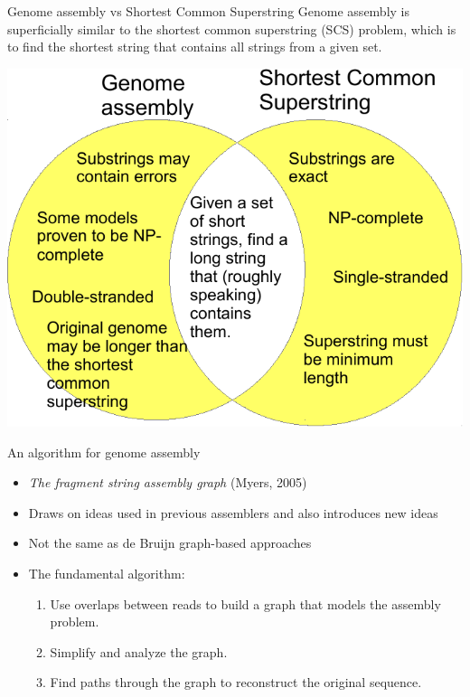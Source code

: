 \documentclass[xcolor=dvipsnames]{beamer}
\begin{document}
\begin{frame}{Genome assembly vs Shortest Common Superstring}
	Genome assembly is superficially similar to the shortest common superstring
	(SCS) problem, which is to find the shortest string that contains all strings
	from a given set.
	\begin{center}
	\includegraphics[scale=0.6]{venn-crop.pdf}
	\end{center}
\end{frame}

\begin{frame}{An algorithm for genome assembly}

	\begin{itemize}
		\item {\it The fragment string assembly graph} (Myers, 2005)
		\item Draws on ideas used in previous assemblers and also introduces new
		ideas
		\item Not the same as de Bruijn graph-based approaches
		\item The fundamental algorithm:
		\begin{enumerate}
			\item Use overlaps between reads to build a graph that models the
			assembly problem.
			\item Simplify and analyze the graph.
			\item Find paths through the graph to reconstruct the original
			sequence.
		\end{enumerate}
	\end{itemize}
\end{frame}
\end{document}
